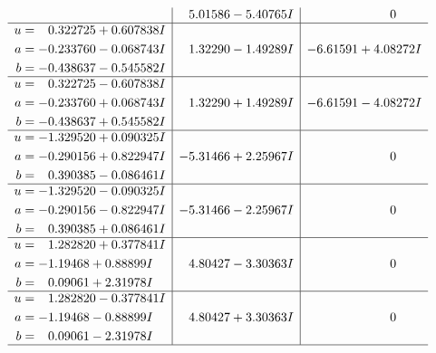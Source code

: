 \documentclass[1p]{elsarticle_modified}
\theoremstyle{definition}
\begin{document}
$$\begin{array}{c|c|c}
 & \phantom{-}5.01586 - 5.40765 I & \phantom{-0.000000 } 0 \\ \hline\begin{aligned}
u &= \phantom{-}0.322725 + 0.607838 I \\
a &= -0.233760 - 0.068743 I \\
b &= -0.438637 - 0.545582 I\end{aligned}
 & \phantom{-}1.32290 - 1.49289 I & -6.61591 + 4.08272 I \\ \hline\begin{aligned}
u &= \phantom{-}0.322725 - 0.607838 I \\
a &= -0.233760 + 0.068743 I \\
b &= -0.438637 + 0.545582 I\end{aligned}
 & \phantom{-}1.32290 + 1.49289 I & -6.61591 - 4.08272 I \\ \hline\begin{aligned}
u &= -1.329520 + 0.090325 I \\
a &= -0.290156 + 0.822947 I \\
b &= \phantom{-}0.390385 - 0.086461 I\end{aligned}
 & -5.31466 + 2.25967 I & \phantom{-0.000000 } 0 \\ \hline\begin{aligned}
u &= -1.329520 - 0.090325 I \\
a &= -0.290156 - 0.822947 I \\
b &= \phantom{-}0.390385 + 0.086461 I\end{aligned}
 & -5.31466 - 2.25967 I & \phantom{-0.000000 } 0 \\ \hline\begin{aligned}
u &= \phantom{-}1.282820 + 0.377841 I \\
a &= -1.19468 + 0.88899 I \\
b &= \phantom{-}0.09061 + 2.31978 I\end{aligned}
 & \phantom{-}4.80427 - 3.30363 I & \phantom{-0.000000 } 0 \\ \hline\begin{aligned}
u &= \phantom{-}1.282820 - 0.377841 I \\
a &= -1.19468 - 0.88899 I \\
b &= \phantom{-}0.09061 - 2.31978 I\end{aligned}
 & \phantom{-}4.80427 + 3.30363 I & \phantom{-0.000000 } 0\\
 \hline 
 \end{array}$$\newpage$$\begin{array}{c|c|c}  

\end{array}$$
\end{document}
